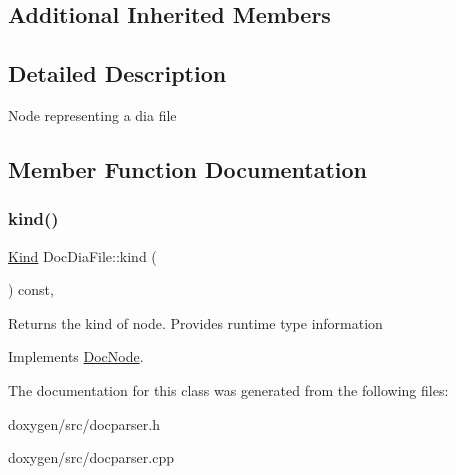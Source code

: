 \subsection*{Additional Inherited Members}


\subsection{Detailed Description}
Node representing a dia file 

\subsection{Member Function Documentation}
\mbox{\label{class_doc_dia_file_a7e9feefcddd9adfb9ea98552e3c0e62d}} 
\subsubsection{\texorpdfstring{kind()}{kind()}}
{\footnotesize\ttfamily \mbox{\hyperlink{class_doc_node_aebd16e89ca590d84cbd40543ea5faadb}{Kind}} Doc\+Dia\+File\+::kind (\begin{DoxyParamCaption}{ }\end{DoxyParamCaption}) const\hspace{0.3cm}{\ttfamily [inline]}, {\ttfamily [virtual]}}

Returns the kind of node. Provides runtime type information 

Implements \mbox{\hyperlink{class_doc_node_a108ffd214a72ba6e93dac084a8f58049}{Doc\+Node}}.



The documentation for this class was generated from the following files\+:\begin{DoxyCompactItemize}
\item 
doxygen/src/docparser.\+h\item 
doxygen/src/docparser.\+cpp\end{DoxyCompactItemize}
